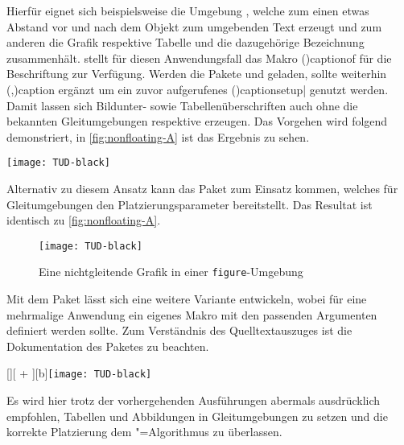 \documentclass[%
  english,ngerman,%
  cdgeometry=no,DIV=12,%
  cd=false,cdfont=false,cdtitle=true,%
  headings=normal,%
  automark,%
  listof=toc,%
]{tudscrartcl}
\begin{document}
Hierfür eignet sich beispielsweise die Umgebung , welche 
zum einen etwas Abstand vor und nach dem Objekt zum umgebenden Text erzeugt 
und zum anderen die Grafik respektive Tabelle und die dazugehörige Bezeichnung 
zusammenhält. \KOMAScript{} stellt für diesen Anwendungsfall das Makro 
\Macro(){captionof} für die Beschriftung zur Verfügung. 
Werden die Pakete  und  geladen, sollte 
weiterhin \Macro(,){caption} ergänzt um 
ein zuvor aufgerufenes 
\Macro(){captionsetup|}
genutzt werden. Damit lassen sich Bildunter- sowie Tabellenüberschriften auch 
ohne die bekannten Gleitumgebungen  respektive 
 erzeugen. Das Vorgehen wird folgend demonstriert, in 
\autoref{fig:nonfloating-A} ist das Ergebnis zu sehen.
%
\begin{Hint}
\begin{center}
\captionsetup{type=figure}
\texttt{[image: TUD-black]}
\caption{%
  Eine nichtgleitende Grafik in einer \texttt{center}-Umgebung%
  \label{fig:nonfloating-A}%
}
\end{center}

\end{Hint}
\InputCode\noindent
%
Alternativ zu diesem Ansatz kann das Paket  zum Einsatz kommen, 
welches für Gleitumgebungen den Platzierungsparameter  
bereitstellt. Das Resultat ist identisch zu \autoref{fig:nonfloating-A}.
%
\begin{Hint}
\begin{figure}[H]
\texttt{[image: TUD-black]}
\caption{%
  Eine nichtgleitende Grafik in einer \texttt{figure}-Umgebung%
  \label{fig:nonfloating-B}%
}
\end{figure}

\end{Hint}
%
Mit dem Paket  lässt sich eine weitere Variante entwickeln, 
wobei für eine mehrmalige Anwendung ein eigenes Makro mit den passenden 
Argumenten definiert werden sollte. Zum Verständnis des Quelltextauszuges ist 
die Dokumentation des Paketes zu beachten.
%
\begin{Hint}
[\FBwidth][%
  \dimexpr\FBheight+\abovedisplayskip\relax%
][b]{\texttt{[image: TUD-black]}}{%
  \caption{%
    Eine nichtgleitende Grafik mit \texttt{\textbackslash floatbox}%
    \label{fig:nonfloating-C}%
  }%
}
\end{Hint}
\InputCode\noindent
%
Es wird hier trotz der vorhergehenden Ausführungen abermals ausdrücklich 
empfohlen, Tabellen und Abbildungen in Gleitumgebungen zu setzen und die 
korrekte Platzierung dem "=Algorithmus zu überlassen.
\end{document}
